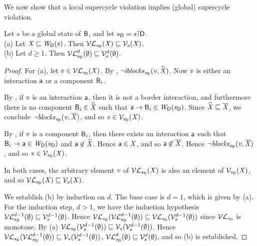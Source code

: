 We now show that a local supercycle violation implies (global) supercycle violation.

\begin{proposition}
\label{prop:lV-subg-V}
Let $s$ be a global state of $\B$, and let $\sD = s \pj \DS$.\\
(a) Let $\XS \subg \lwfg{B}{s}{\DS}$. Then $\lVFs{\sD}{\XS} \subg \VFs{s}{\XS}$.\\
(b) Let $d \ge 1$. Then $\lVFsi{\sD}{\ewfg}{d} \subg \VFsi{s}{\ewfg}{d}$.
\end{proposition}
%
\begin{proof}
For (a), let $\ndv \in \lVFs{\sD}{\XS}$. By , $\neg \lblocks{\sD}{\ndv}{\complL{\XS}}$.
Now $\ndv$ is either an interaction $\act$ or a component $\B_i$. 

By , if $\ndv$ is an interaction $\act$, then it is not a border interaction, and furthermore there is no
component $\B_i \in \complL{\XS}$ such that $\act \ar \B_i \in \lwfg{\B}{\sD}{\DS}$. 
Since $\complL{\XS} \subg \compl{\XS}$, we conclude $\neg \blocks{\sD}{\ndv}{\compl{\XS}}$, and so $\ndv \in \VFs{\sD}{\XS}$.

By , if $\ndv$ is a component $\B_i$, then there exists an interaction $\act$ such that 
$\B_i \ar \act \in \lwfg{\B}{\sD}{\DS}$ and $\act \not\in \complL{\XS}$. Hence $\act \in \XS$, and so $\act \not\in \compl{\XS}$.
Hence  $\neg \blocks{\sD}{\ndv}{\compl{\XS}}$, and so $\ndv \in \VFs{\sD}{\XS}$.

In both cases, the arbitrary element $\ndv$ of $\lVFs{\sD}{\XS}$ is also an element of $\VFs{\sD}{\XS}$, and so 
$\lVFs{\sD}{\XS} \subg \VFs{s}{\XS}$.

We establish (b) by induction on $d$. The base case is $d=1$, which is given by (a).
For the induction step, $d > 1$, we have the induction hypothesis
$\lVFsi{\sD}{\ewfg}{d-1} \subg \VFsi{s}{\ewfg}{d-1}$.
Hence $\lVFs{\sD}{\lVFsi{\sD}{\ewfg}{d-1}} \subg \lVFs{\sD}{\VFsi{s}{\ewfg}{d-1}}$ since $\lVFsymb_{\sD}$ is monotone.
By (a) $\lVFs{\sD}{\VFsi{s}{\ewfg}{d-1}} \subg \VFs{s}{\VFsi{s}{\ewfg}{d-1}}$.
Hence $\lVFs{\sD}{\lVFsi{\sD}{\ewfg}{d-1}}   \subg \VFs{s}{\VFsi{s}{\ewfg}{d-1}}$, \ie
$\lVFsi{\sD}{\ewfg}{d}   \subg \VFsi{s}{\ewfg}{d}$, and so (b) is established.
\end{proof}


